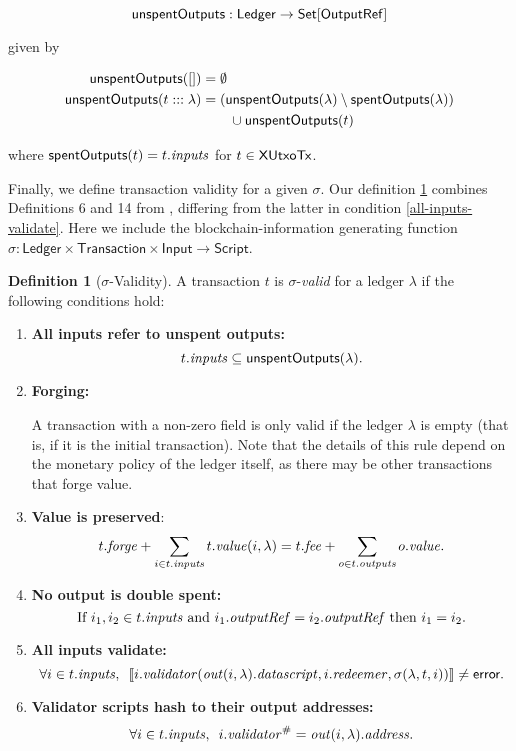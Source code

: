 \documentclass[a4paper]{article}
\theoremstyle{definition}  %
\newtheorem{definition}{Definition}
\begin{document}
\[
  \mathsf{unspentOutputs} : \mathsf{Ledger} \rightarrow \mathsf{Set[OutputRef]}
\]

\noindent given by

\begin{align*}
   \mathsf{unspentOutputs}([]) &=\emptyset \\
   \mathsf{unspentOutputs}(t:::\lambda) &= (\mathsf{unspentOutputs}(\lambda) \setminus \mathsf{spentOutputs}(\lambda)) \\
    & \qquad \cup \mathsf{unspentOutputs}(t)
\end{align*}

\noindent where $\mathsf{spentOutputs}(t) = t.\mathit{inputs}$ for $t \in \mathsf{XUtxoTx}$.

Finally, we define transaction validity for a given $\sigma$. Our definition
\ref{def:validity} combines Definitions 6 and 14 from
\cite{Zahnentferner18-UTxO}, differing from the latter in condition
\ref{all-inputs-validate}. Here we include the blockchain-information
generating function $\sigma : \mathsf{Ledger} \times
\mathsf{Transaction} \times \mathsf{Input} \rightarrow
\mathsf{Script}$.

\begin{definition}[$\sigma$-Validity]\label{def:validity} A transaction $t$ is $\sigma$-\emph{valid} for a ledger $\lambda$ if the following conditions hold:
  \begin{enumerate}
    \item \label{all-inputs-refer-to-unspent-outputs} \textbf{All
      inputs refer to unspent outputs:}
      \[
        t.\mathit{inputs} \subseteq \mathsf{unspentOutputs}(\lambda).
      \]
    \item\label{forging} \textbf{Forging:}
      \begin{center}
        \parbox{0.8\textwidth}{
        A transaction with a non-zero \forge{} field is only
        valid if the ledger $\lambda$ is empty
        (that is, if it is the initial
        transaction). Note that the details of this rule depend on the
        monetary policy of the ledger itself, as there may be other
        transactions that forge value.
        }
    \end{center}
      
    \item \label{value-is-preserved} \textbf{Value is preserved}:
    \[
      t.\mathit{forge} + \sum_{i \in t.\mathit{inputs}} t.\mathit{value}(i, \lambda) = t.\mathit{fee} + \sum_{o \in t.\mathit{outputs}} o.\mathit{value}.
    \]
    \item \label{no-double-spending} \textbf{No output is double spent:}
    \[
     \textrm{If } i_1, i_2 \in t.\mathit{inputs} \textrm{ and }  i_1.\mathit{outputRef} = i_2.\mathit{outputRef}
     \textrm{ then } i_1 = i_2.
    \]
    \item\label{all-inputs-validate} \textbf{All inputs validate:}
    \[
    \forall i \in t.\mathit{inputs},\enspace \llbracket
    i.\mathit{validator}(\mathit{out}(i, \lambda).\mathit{datascript},i.\mathit{redeemer}, \sigma(\lambda, t, i)) \rrbracket \ne \textsf{error}.
      \]
    \item\label{validator-scripts-hash} \textbf{Validator scripts hash to their output addresses:}
    \[
      \forall i \in t.\mathit{inputs},\enspace i.\mathit{validator}^{\#} = \mathit{out}(i, \lambda).\mathit{address}.
    \]
  \end{enumerate}
\end{definition}
\end{document}
